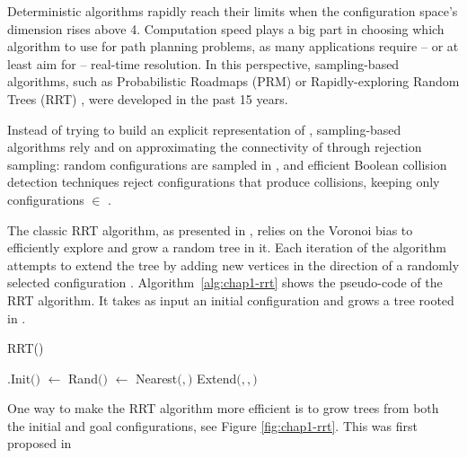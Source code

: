 Deterministic algorithms rapidly reach their limits when the
configuration space's dimension rises above 4. Computation speed plays
a big part in choosing which algorithm to use for path planning
problems, as many applications require -- or at least aim for --
real-time resolution. In this perspective, sampling-based algorithms,
such as Probabilistic Roadmaps (PRM) \cite{kavr96} or
Rapidly-exploring Random Trees (RRT) \cite{kuff00}, were developed in
the past 15 years.

Instead of trying to build an explicit representation of \cfree,
sampling-based algorithms rely and on approximating the connectivity
of \cfree through rejection sampling: random configurations
 are sampled in \cspace, and efficient Boolean collision
detection techniques \cite{vand97, huds97, gott96} reject
configurations that produce collisions, keeping only configurations
\config{} $\in$ \cfree.

The classic RRT algorithm, as presented in \cite{kuff00}, relies on
the Voronoi bias to efficiently explore \cfree and grow a random tree
in it. Each iteration of the algorithm attempts to extend the tree by
adding new vertices in the direction of a randomly selected
configuration . Algorithm~\ref{alg:chap1-rrt} shows the
pseudo-code of the RRT algorithm. It takes as input an initial
configuration  and grows a tree \ctree rooted in .

\begin{algorithm}
\caption{RRT()}
\label{alg:chap1-rrt}
\begin{algorithmic}
\STATE \ctree$.$Init$($$)$
\STATE {} $ \leftarrow $ Rand$($\cspace$)$
\STATE {}$ \leftarrow $ Nearest$($$,$\ctree$)$
\STATE Extend$($\ctree$,$$,$$)$
\ENDFOR
\end{algorithmic}
\end{algorithm}

One way to make the RRT algorithm more efficient is to grow trees from
both the initial and goal configurations, see Figure
\ref{fig:chap1-rrt}. This was first proposed in \cite{kuff00}

